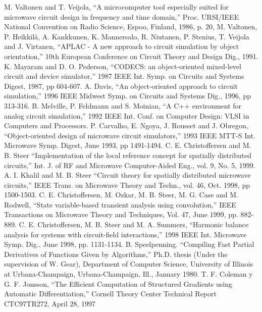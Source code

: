 \begin{thebibliography}{99}
%
 M. Valtonen and T. Veijola, ``A microcomputer tool
especially suited for microwave circuit design in frequency and time
domain,'' Proc. URSI/IEEE National Convention on Radio
Science, Espoo, Finland, 1986, p. 20,
%
 M. Valtonen, P. Heikkil\"a, A. Kankkunen, K.
Mannersalo, R. Niutanen, P. Stenius, T. Veijola and J.  Virtanen,
``APLAC - A new approach to circuit simulation by object
orientation,'' {10th European Conference on Circuit Theory and
Design Dig.}, 1991.
%
 K. Mayaram and D. O. Pederson, ``CODECS: an
object-oriented mixed-level circuit and device simulator,'' {1987
IEEE Int. Symp. on Circuits and Systems Digest}, 1987, pp 604-607.
%
 A. Davis, ``An object-oriented approach to circuit
simulation,'' {1996 IEEE Midwest Symp. on Circuits and
Systems Dig.}, 1996, pp 313-316.
%
 B. Melville, P. Feldmann and S. Moinian, ``A C++
environment for analog circuit simulation,'' {1992 IEEE
Int. Conf. on Computer Design: VLSI in Computers and Processors.}
%
 P. Carvalho, E. Ngoya, J. Rousset and J. Obregon,
``Object-oriented design of microwave circuit simulators,'' {1993
IEEE MTT-S Int. Microwave Symp. Digest}, June 1993, pp 1491-1494.
%
 C. E. Christoffersen and
M. B. Steer ``Implementation of the local reference concept for
spatially distributed circuits,'' {Int. J. of RF and Microwave
Computer-Aided Eng.}, vol. 9, No. 5, 1999.
%
 A. I. Khalil and M. B. Steer
``Circuit theory for spatially distributed microwave circuits,'' {IEEE
Trans. on Microwave Theory and Techn.}, vol. 46, Oct. 1998, pp
1500-1503.
%
 C. E. Christoffersen, M. Ozkar, M. B. Steer, M. G. Case
and M. Rodwell, ``State variable-based transient analysis using
convolution,'' {IEEE Transactions on Microwave Theory and Techniques},
Vol. 47, June 1999, pp. 882-889.
%
 C. E. Christoffersen, M. B. Steer and M. A. Summers,
``Harmonic balance analysis for systems with circuit-field
interactions,'' {1998 IEEE Int. Microwave Symp. Dig.}, June 1998,
pp. 1131-1134.
%
 B. Speelpenning. ``Compiling Fast Partial
Derivatives of Functions Given by Algorithms,'' Ph.D. thesis (Under
the supervision of W. Gear), Department of Computer Science,
University of Illinois at Urbana-Champaign, Urbana-Champaign, Ill.,
January 1980.
%
 T. F. Coleman y G. F. Jonsson, ``The Efficient
Computation of Structured Gradients using Automatic Differentiation,''
Cornell Theory Center Technical Report CTC97TR272, April 28, 1997

\end{thebibliography}
